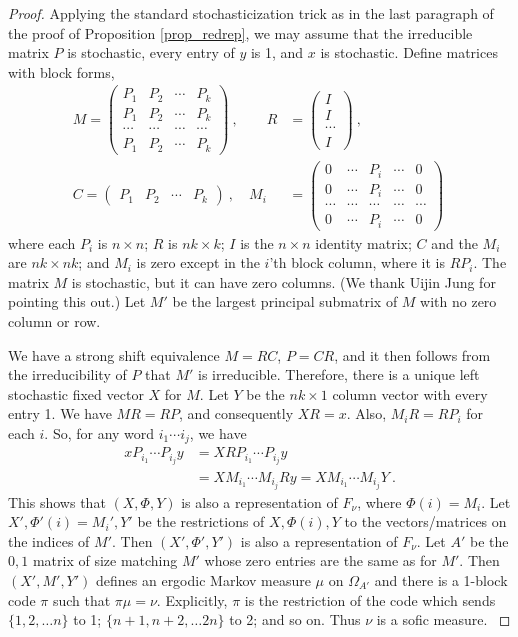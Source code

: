 \documentclass{kepart2010}
\theoremstyle{plain}
\theoremstyle{definition}
\theoremstyle{remark}
\theoremstyle{definition}
\numberwithin{equation}{section}
\begin{document}
\begin{proof}
{}{ Applying the standard stochasticization trick as in the last
paragraph of the proof of Proposition \ref{prop_redrep}, we may
assume that the irreducible matrix $P$ is stochastic, every entry of
$y$ is 1, and $x$ is stochastic. Define matrices with block forms,
\begin{align*}
 M =
\begin{pmatrix}
P_1 & P_2 & \cdots &P_k \\
P_1 & P_2 & \cdots &P_k \\
\cdots &\cdots & \cdots &\cdots  \\
P_1 & P_2 & \cdots &P_k
\end{pmatrix} \ , \qquad
R& =\begin{pmatrix}
I \\
I \\
\cdots \\
I
\end{pmatrix} \ , \\
C=\begin{pmatrix}
P_1 & P_2 &
\cdots & P_k
\end{pmatrix} \ , \quad
M_i &=
\begin{pmatrix}
0 & \cdots & P_i & \cdots & 0 \\
0 &  \cdots & P_i & \cdots & 0 \\
\cdots  &  \cdots & \cdots & \cdots &\cdots  \\
0 &  \cdots & P_i & \cdots & 0
\end{pmatrix} \
\end{align*}
where each $P_i$ is $n\times n$; $R$ is $nk\times k$;
$I$ is the $n\times n$ identity matrix; $C$ and the $M_i$ are
 $nk \times nk$; and  $M_i$ is zero except in the $i$'th block
column, where it is $RP_i$.
The matrix $M$ is stochastic, but
it can have zero columns. (We thank Uijin Jung for
pointing this out.)  Let $M'$ be the largest principal
submatrix of $M$ with no zero column or row.
}

{}{ We have a strong shift equivalence $M=RC$, $P=CR$,  and it then
follows from the irreducibility of $P$ that  $M'$ is irreducible.
Therefore, there is a unique left stochastic fixed vector $X$ for
$M$. Let $Y$ be the $nk\times 1$ column vector with every entry 1.
We have $MR=RP$, and consequently $XR=x$. Also, $M_iR=RP_i$ for each
$i$. So, for any word $i_1 \cdots i_j$, we have
\begin{align*}
xP_{i_1}\cdots P_{i_j}y &=
XRP_{i_1}\cdots P_{i_j}y \\
&=XM_{i_1}\cdots M_{i_j}Ry =
XM_{i_1}\cdots M_{i_j}Y \ .
\end{align*}
This shows that $(X,\Phi , Y)$ is also a representation of
$F_{\nu}$, where $\Phi(i)=M_i$. Let $X', \Phi'(i)=M_i', Y'$ be the
restrictions of $X, \Phi (i),Y$ to the vectors/matrices on the
indices of $M'$. Then  $(X',\Phi' , Y')$ is also a representation of
$F_{\nu}$. Let $A'$ be the $0,1$ matrix of size matching $M'$ whose
zero entries are the same as for $M'$. Then $(X',M',Y')$ defines an
ergodic Markov measure $\mu$ on $\Omega_{A'}$ and there is a 1-block
code $\pi$ such that $\pi \mu = \nu$.
 Explicitly, $\pi$ is the restriction of the code which
sends $\{ 1,2,\dots n\}$ to 1; $\{n+ 1,n+2,\dots 2n\}$ to 2; and so
on.
Thus $\nu$ is a sofic measure.
}


\end{proof}
\end{document}
